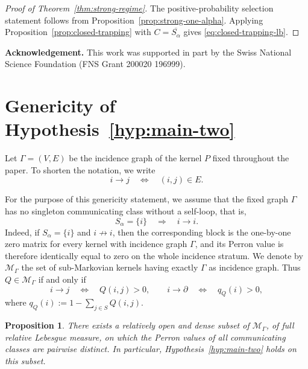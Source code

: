 \documentclass[10pt,letterpaper]{article}
\theoremstyle{compactplain}
\newtheorem{proposition}[theorem]{Proposition}
\theoremstyle{compactdefinition}
\newcommand{\1}{\mathds{1}}
\begin{document}
\begin{proof}[Proof of Theorem~\ref{thm:strong-regime}]
The positive-probability selection statement follows from
Proposition~\ref{prop:strong-one-alpha}. Applying
Proposition~\ref{prop:closed-trapping} with
\(C=\overline{S_\alpha}\) gives
\eqref{eq:closed-trapping-lb}.
\end{proof}


\textbf{Acknowledgement.} This work was supported in part by the Swiss National Science Foundation (FNS Grant 200020 196999).

\appendix


\section{Genericity of Hypothesis~\ref{hyp:main-two}}
\label{app:genericity}

Let \(\Gamma=(V,E)\) be the incidence graph of the kernel \(P\) fixed
throughout the paper. To shorten the notation, we write
\[
i\to j
\quad\Longleftrightarrow\quad
(i,j)\in E.
\]

For the purpose of this genericity statement, we assume that the fixed graph
\(\Gamma\) has no singleton communicating class without a self-loop, that is,
\[
S_\alpha=\{i\}
\quad\Longrightarrow\quad
i\to i.
\]
Indeed, if \(S_\alpha=\{i\}\) and \(i\not\to i\), then the corresponding
block is the one-by-one zero matrix for every kernel with incidence graph
\(\Gamma\), and its Perron value is therefore identically equal to zero on
the whole incidence stratum. We denote by \(\mathcal M_\Gamma\) the set of sub-Markovian kernels having
exactly \(\Gamma\) as incidence graph. Thus \(Q\in\mathcal M_\Gamma\) if and
only if
\[
i\to j
\quad\Longleftrightarrow\quad
Q(i,j)>0,
\qquad
i\to\partial
\quad\Longleftrightarrow\quad
q_Q(i)>0,
\]
where
\(
q_Q(i):=1-\sum_{j\in S}Q(i,j).
\)

\begin{proposition}
There exists a relatively open and dense subset of
\(\mathcal M_\Gamma\), of full relative Lebesgue measure, on which the
Perron values of all communicating classes are pairwise distinct. In
particular, Hypothesis~\ref{hyp:main-two} holds on this subset.
\end{proposition}
\end{document}
